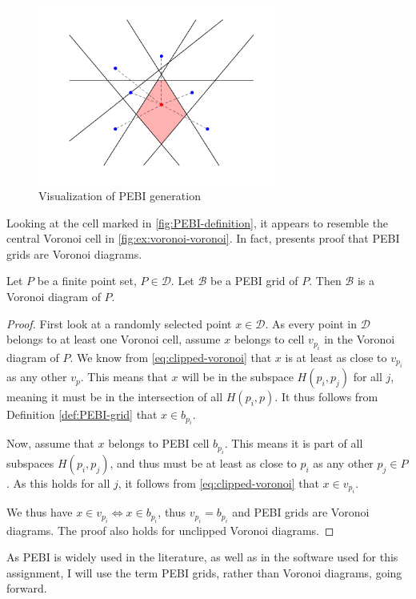 \begin{figure}[ht]
    \centering
    \includegraphics[width=0.7\textwidth]{report/Images/Theory/PEBI_definition.png}
    \caption{Visualization of PEBI generation}
    \label{fig:PEBI-definition}
\end{figure}

Looking at the cell marked in \autoref{fig:PEBI-definition}, it appears to resemble the central Voronoi cell in \autoref{fig:ex:voronoi-voronoi}. In fact, \textcite{UPR_chapter} presents proof that PEBI grids are Voronoi diagrams.

\begin{theorem}
\label{theorem:PEBI-voronoi}
Let $P$ be a finite point set, $P \in \mathcal{D}$. Let $\mathcal{B}$ be a PEBI grid of $P$. Then $\mathcal{B}$ is a Voronoi diagram of $P$.
\end{theorem}
\begin{proof}
First look at a randomly selected point $x \in \mathcal{D}$. As every point in $\mathcal{D}$ belongs to at least one Voronoi cell, assume $x$ belongs to cell $v_{p_i}$ in the Voronoi diagram of $P$. We know from  \autoref{eq:clipped-voronoi} that $x$ is at least as close to $v_{p_i}$ as any other $v_p$. This means that $x$ will be in the subspace $H(p_i, p_j)$ for all $j$, meaning it must be in the intersection of all $H(p_i, p)$. It thus follows from Definition \ref{def:PEBI-grid} that $x \in b_{p_i}$.

Now, assume that $x$ belongs to PEBI cell $b_{p_i}$. This means it is part of all subspaces $H(p_i, p_j)$, and thus must be at least as close to $p_i$ as any other $p_j \in P$. As this holds for all $j$, it follows from \autoref{eq:clipped-voronoi} that $x \in v_{p_i}$.

We thus have $x \in v_{p_i} \iff x \in b_{p_i}$, thus $v_{p_i} = b_{p_i}$ and PEBI grids are Voronoi diagrams. The proof also holds for unclipped Voronoi diagrams.
\end{proof}

As PEBI is widely used in the literature, as well as in the software used for this assignment, I will use the term PEBI grids, rather than Voronoi diagrams, going forward.

